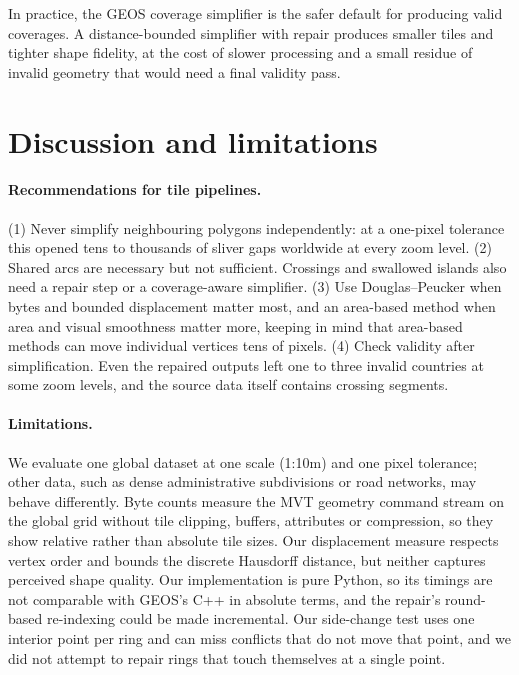 \documentclass[11pt]{article}
\begin{document}
In practice, the GEOS coverage simplifier is the safer default for producing
valid coverages. A distance-bounded simplifier with repair produces smaller
tiles and tighter shape fidelity, at the cost of slower processing and a small
residue of invalid geometry that would need a final validity pass.

\section{Discussion and limitations}

\paragraph{Recommendations for tile pipelines.}
(1) Never simplify neighbouring polygons independently: at a one-pixel
tolerance this opened tens to thousands of sliver gaps worldwide at every
zoom level. (2) Shared arcs are necessary but not sufficient. Crossings and
swallowed islands also need a repair step or a coverage-aware simplifier.
(3) Use Douglas--Peucker when bytes and bounded displacement matter most, and an
area-based method when area and visual smoothness matter more, keeping in mind
that area-based methods can move individual vertices tens of pixels.
(4) Check validity after simplification. Even the repaired outputs left one to
three invalid countries at some zoom levels, and the source data itself
contains crossing segments.

\paragraph{Limitations.}
We evaluate one global dataset at one scale (1:10m) and one pixel tolerance;
other data, such as dense administrative subdivisions or road networks, may
behave differently. Byte counts measure the MVT geometry command stream on the
global grid without tile clipping, buffers, attributes or compression, so they
show relative rather than absolute tile sizes. Our displacement measure respects
vertex order and bounds the discrete Hausdorff distance, but neither captures
perceived shape quality. Our implementation is pure Python, so its timings are
not comparable with GEOS's C++ in absolute terms, and the repair's round-based
re-indexing could be made incremental. Our side-change test uses one interior
point per ring and can miss conflicts that do not move that point, and we did
not attempt to repair rings that touch themselves at a single point.
\end{document}
